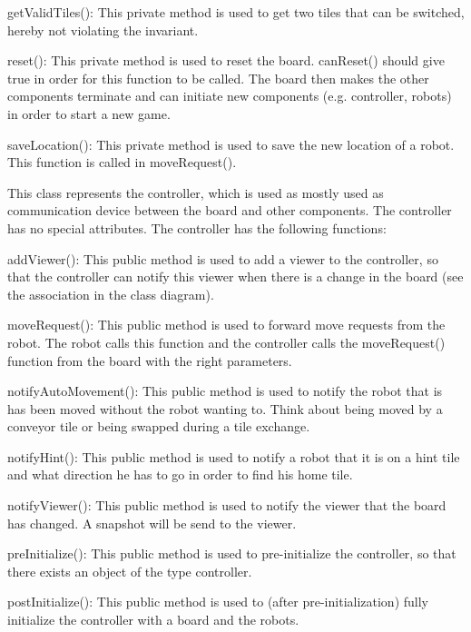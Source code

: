 \begin{description}
\begin{description}
            \item getValidTiles(): This private method is used to get two tiles that can be switched, hereby not violating the invariant.
            \item reset(): This private method is used to reset the board. canReset() should give true in order for this function to be called. The board then makes the other components terminate and can initiate new components (e.g. controller, robots) in order to start a new game.
            \item saveLocation(): This private method is used to save the new location of a robot. This function is called in moveRequest().
        \end{description}        
		\item[Controller] This class represents the controller, which is used as mostly used as communication device between the board and other components. The controller has no special attributes. The controller has the following functions:
        \begin{description}
            \item addViewer(): This public method is used to add a viewer to the controller, so that the controller can notify this viewer when there is a change in the board (see the association in the class diagram).
            \item moveRequest(): This public method is used to forward move requests from the robot. The robot calls this function and the controller calls the moveRequest() function from the board with the right parameters.
            \item notifyAutoMovement(): This public method is used to notify the robot that is has been moved without the robot wanting to. Think about being moved by a conveyor tile or being swapped during a tile exchange.
            \item notifyHint(): This public method is used to notify a robot that it is on a hint tile and what direction he has to go in order to find his home tile.
            \item notifyViewer(): This public method is used to notify the viewer that the board has changed. A snapshot will be send to the viewer.
            \item preInitialize(): This public method is used to pre-initialize the controller, so that there exists an object of the type controller.
            \item postInitialize(): This public method is used to (after pre-initialization) fully initialize the controller with a board and the robots.

\end{description}
\end{description}
